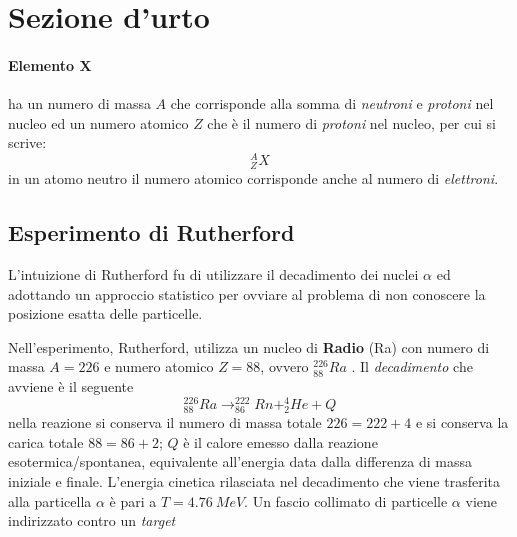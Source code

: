
\section{Sezione d'urto}

\paragraph{Elemento X} ha un numero di massa $A$ che corrisponde alla somma di \emph{neutroni} e \emph{protoni} nel nucleo ed un numero atomico $Z$ che è il numero di \emph{protoni} nel nucleo, per cui si scrive:
$$^{A}_{Z} X$$
in un atomo neutro il numero atomico corrisponde anche al numero di \emph{elettroni}.


\subsection{Esperimento di Rutherford}
L'intuizione di Rutherford fu di utilizzare il decadimento dei nuclei $\alpha$ ed adottando un approccio statistico per ovviare al problema di non conoscere la posizione esatta delle particelle.

Nell'esperimento, Rutherford, utilizza un nucleo di \textbf{Radio} (Ra) con numero di massa $A=226$ e numero atomico $Z=88$, ovvero $^{226}_{88} Ra$ .
Il \emph{decadimento} che avviene è il seguente
\begin{equation}
^{226}_{88} Ra \longrightarrow ^{222}_{86}Rn + ^{4}_{2}He + Q
\end{equation}
nella reazione si conserva il numero di massa totale $ 226 = 222 + 4 $ e si conserva la carica totale $ 88 = 86 + 2 $;
$Q$ è il calore emesso dalla reazione esotermica/spontanea, equivalente all'energia data dalla differenza di massa iniziale e finale. 
L'energia cinetica rilasciata nel decadimento che viene trasferita alla particella $\alpha$ è pari a $T = \SI{4.76}{MeV}$.
Un fascio collimato di particelle $\alpha$ viene indirizzato contro un \emph{target} 



